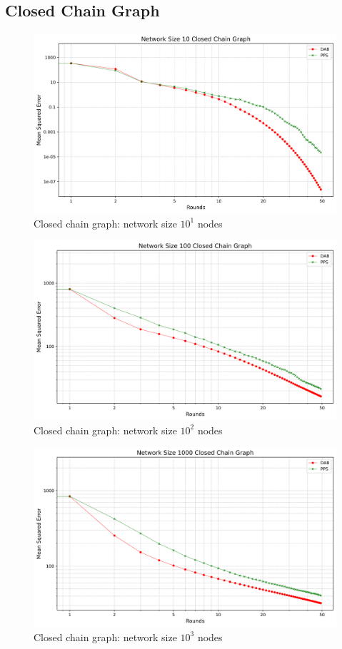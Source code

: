 \subsection{Closed Chain Graph}
\begin{figure}[H]
    \centering
    \includegraphics[scale=0.5]{figures/closedChainSimulations/DAB_vs_PPS_CCG_r50_n10.png}
    \caption{Closed chain graph: network size $10^{1}$ nodes}
    \label{fig:10ChainGraph}
\end{figure}
\begin{figure}[H]
    \centering
    \includegraphics[scale=0.5]{figures/closedChainSimulations/DAB_vs_PPS_CCG_r50_n100.png}
    \caption{Closed chain graph: network size $10^{2}$ nodes}
    \label{fig:100ChainGraph}
\end{figure}
\begin{figure}[H]
    \centering
    \includegraphics[scale=0.5]{figures/closedChainSimulations/DAB_vs_PPS_CCG_r50_n1000.png}
    \caption{Closed chain graph: network size $10^{3}$ nodes}
    \label{fig:1000ChainGraph}
\end{figure}
